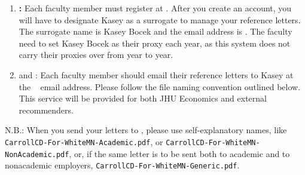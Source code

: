 \documentclass{econtex}
\begin{document}
\begin{enumerate}
\item {\bf \AEA:}
Each faculty member must register at \AEARecLink. After you create an account, you will have to designate Kasey as a surrogate to manage your reference letters. The surrogate name is Kasey Bocek and the email address is \JMStaffEmail. The faculty need to set Kasey Bocek as their proxy each year, as this system does not carry their proxies over from year to year. %

\item {{\bf \AJO} and \Interfolio:}
Each faculty member should email their reference letters to Kasey at the \JMStaffEmail~ email address. Please follow the file naming convention outlined below. This service will be provided for both JHU Economics and external recommenders.

\end{enumerate}

N.B.:  When you send your letters to \JMStaffEmail, please use self-explanatory names, like
\texttt{CarrollCD-For-WhiteMN-Academic.pdf}, or
\texttt{CarrollCD-For-WhiteMN-NonAcademic.pdf}, or, if the same letter
is to be sent both to academic and to nonacademic employers,
\texttt{CarrollCD-For-WhiteMN-Generic.pdf}.
\end{document}
